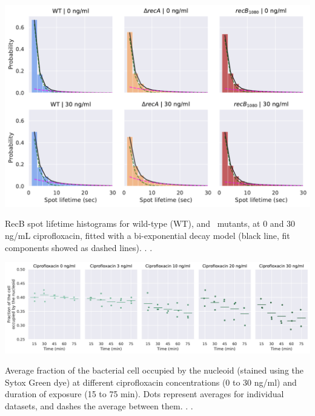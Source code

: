 \begin{suppfigure*}[htbp]
    \begin{center}
    \includegraphics[width=.8\textwidth]{SI_Figures/Mutants_RecB_fits.pdf}
    \end{center}
    \caption{RecB spot lifetime histograms for wild-type (WT), \dreca and \geneteneighty\ mutants, at 0 and 30 ng/mL ciprofloxacin, fitted with a bi-exponential decay model (black line, fit components showed as dashed lines). . .}
    \label{SIFig:mutants_biexp_fits}
\end{suppfigure*}

\begin{suppfigure*}[htbp]
    \begin{center}
    \includegraphics[width=\textwidth]{SI_Figures/Nucleoid_compaction.pdf}
    \end{center}
    \caption{Average fraction of the bacterial cell occupied by the nucleoid (stained using the Sytox Green dye) at different ciprofloxacin concentrations (0 to 30 ng/ml) and duration of exposure (15 to 75 min). Dots represent averages for individual datasets, and dashes the average between them. . .}
    \label{SIFig:nucleoid_compaction}
\end{suppfigure*}

